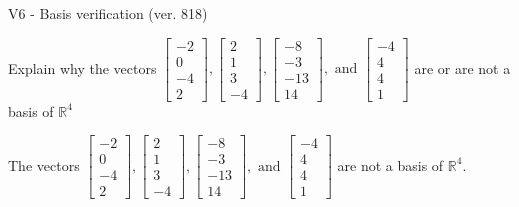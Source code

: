 \begin{exercise}
  \begin{exerciseTitle}V6 - Basis verification (ver. 818)\end{exerciseTitle}
  \begin{exerciseStatement}
    Explain why the vectors \(\left[\begin{array}{r}
-2 \\
0 \\
-4 \\
2
\end{array}\right] , \left[\begin{array}{r}
2 \\
1 \\
3 \\
-4
\end{array}\right] , \left[\begin{array}{r}
-8 \\
-3 \\
-13 \\
14
\end{array}\right] , \text{ and } \left[\begin{array}{r}
-4 \\
4 \\
4 \\
1
\end{array}\right]\) are or are not a basis of \(\mathbb{R}^4\)	


  \end{exerciseStatement}
  \begin{exerciseAnswer}
   The vectors \(\left[\begin{array}{r}
-2 \\
0 \\
-4 \\
2
\end{array}\right] , \left[\begin{array}{r}
2 \\
1 \\
3 \\
-4
\end{array}\right] , \left[\begin{array}{r}
-8 \\
-3 \\
-13 \\
14
\end{array}\right] , \text{ and } \left[\begin{array}{r}
-4 \\
4 \\
4 \\
1
\end{array}\right]\) 
  	 are not  a basis of \(\mathbb{R}^4\).
  


  \end{exerciseAnswer}
\end{exercise}